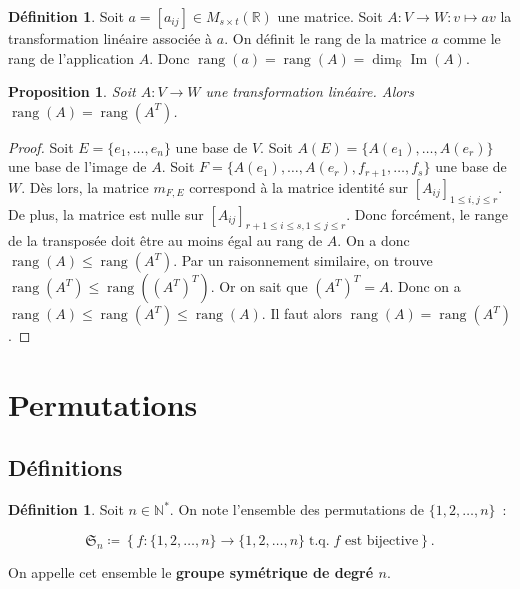 \documentclass{article}
\DeclareMathOperator{\tq}{\text{ t.q. }}
\DeclareMathOperator{\Imf}{Im}
\DeclareMathOperator{\rang}{rang}
\newcommand{\R}{\mathbb R}
\newcommand{\M}[3]{M_{#1 \times #2}(#3)}
\newtheorem{prp}[thm]{Proposition}
\theoremstyle{definition}
\newtheorem{déf}[thm]{Définition}
\theoremstyle{remark}
\begin{document}
		\begin{déf} Soit $a = [a_{ij}] \in \M st\R$ une matrice. Soit $A : V \to W : v \mapsto av$ la transformation linéaire associée à $a$. On définit le rang de la matrice
		$a$ comme le rang de l'application $A$. Donc $\rang(a) = \rang(A) = \dim_\R\Imf(A)$. \end{déf}

		\begin{prp} Soit $A : V \to W$ une transformation linéaire. Alors $\rang(A) = \rang(A^T)$. \end{prp}

		\begin{proof} Soit $E = \{e_1, \ldots, e_n\}$ une base de $V$. Soit $A(E) = \{A(e_1), \ldots, A(e_r)\}$ une base de l'image de $A$. Soit
		$F = \{A(e_1), \ldots, A(e_r), f_{r+1}, \ldots, f_s\}$ une base de $W$. Dès lors, la matrice $m_{F, E}$ correspond à la matrice identité sur
		$[A_{ij}]_{1 \leq i, j \leq r}$. De plus, la matrice est nulle sur $[A_{ij}]_{r+1 \leq i \leq s, 1 \leq j \leq r}$. Donc forcément, le range de la transposée doit être
		au moins égal au rang de $A$. On a donc $\rang(A) \leq \rang(A^T)$. Par un raisonnement similaire, on trouve $\rang(A^T) \leq \rang\left(\left(A^T\right)^T\right)$.
		Or on sait que $\left(A^T\right)^T = A$. Donc on a $\rang(A) \leq \rang(A^T) \leq \rang(A)$. Il faut alors $\rang(A) = \rang(A^T)$. \end{proof} 

\section{Permutations}
	\subsection{Définitions}
		\begin{déf} Soit $n \in \mathbb N^*$. On note l'ensemble des permutations de $\{1, 2, \ldots, n\}$~:
		
		\[\mathfrak{S}_n \coloneqq \left\{f : \{1, 2, \ldots, n\} \to \{1, 2, \ldots, n\} \tq f \text{ est bijective}\right\}.\]
		
		On appelle cet ensemble le \textbf{groupe symétrique de degré $n$}. \end{déf}
\end{document}
